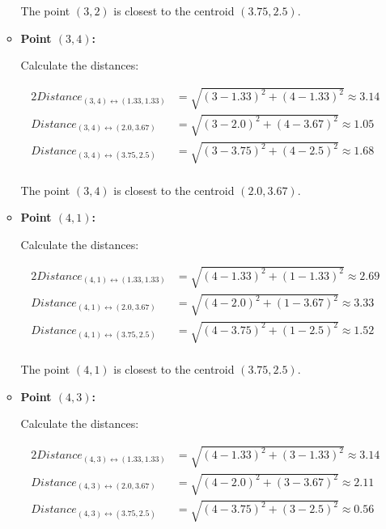 \documentclass[
english,
smallborders
]{i6prcsht}
\begin{document}
\begin{solution}
\begin{enumerate}
\begin{itemize}
			            The point $(3,2)$ is closest to the centroid $(3.75,2.5)$.
			            
			      \item \textbf{Point $(3,4)$:}
			            
			            Calculate the distances:
			            
			            \begin{alignat*}{2}
				            Distance_{(3,4)\leftrightarrow(1.33,1.33)} & = \sqrt{(3-1.33)^2+(4-1.33)^2} \approx 3.14 \\
				            Distance_{(3,4)\leftrightarrow(2.0,3.67)}  & = \sqrt{(3-2.0)^2+(4-3.67)^2} \approx 1.05  \\
				            Distance_{(3,4)\leftrightarrow(3.75,2.5)}  & = \sqrt{(3-3.75)^2+(4-2.5)^2} \approx 1.68  \\
			            \end{alignat*}
			            
			            The point $(3,4)$ is closest to the centroid $(2.0,3.67)$.
			            
			      \item \textbf{Point $(4,1)$:}
			            
			            Calculate the distances:
			            
			            \begin{alignat*}{2}
				            Distance_{(4,1)\leftrightarrow(1.33,1.33)} & = \sqrt{(4-1.33)^2+(1-1.33)^2} \approx 2.69 \\
				            Distance_{(4,1)\leftrightarrow(2.0,3.67)}  & = \sqrt{(4-2.0)^2+(1-3.67)^2} \approx 3.33  \\
				            Distance_{(4,1)\leftrightarrow(3.75,2.5)}  & = \sqrt{(4-3.75)^2+(1-2.5)^2} \approx 1.52  \\
			            \end{alignat*}
			            
			            The point $(4,1)$ is closest to the centroid $(3.75,2.5)$.
			            
			      \item \textbf{Point $(4,3)$:}
			            
			            Calculate the distances:
			            
			            \begin{alignat*}{2}
				            Distance_{(4,3)\leftrightarrow(1.33,1.33)} & = \sqrt{(4-1.33)^2+(3-1.33)^2} \approx 3.14 \\
				            Distance_{(4,3)\leftrightarrow(2.0,3.67)}  & = \sqrt{(4-2.0)^2+(3-3.67)^2} \approx 2.11  \\
				            Distance_{(4,3)\leftrightarrow(3.75,2.5)}  & = \sqrt{(4-3.75)^2+(3-2.5)^2} \approx 0.56  \\
			            \end{alignat*}
			            

\end{itemize}
\end{enumerate}
\end{solution}
\end{document}
